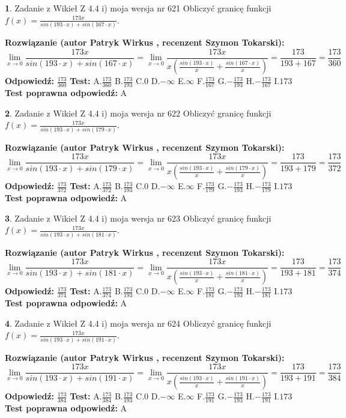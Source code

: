 \documentclass[12pt, a4paper]{article}
\theoremstyle{definition} %
\newtheorem{zad}{}
\newcommand{\zadStart}[1]{\begin{zad}#1\newline}
\newcommand{\zadStop}{\end{zad}}
\newcommand{\rozwStart}[2]{\noindent \textbf{Rozwiązanie (autor #1 , recenzent #2): }\newline}
\newcommand{\rozwStop}{\newline}
\newcommand{\odpStart}{\noindent \textbf{Odpowiedź:}\newline}
\newcommand{\odpStop}{\newline}
\newcommand{\testStart}{\noindent \textbf{Test:}\newline}
\newcommand{\testStop}{\newline}
\newcommand{\kluczStart}{\noindent \textbf{Test poprawna odpowiedź:}\newline}
\newcommand{\kluczStop}{\newline}
\begin{document}
\zadStart{Zadanie z Wikieł Z 4.4 i) moja wersja nr 621}
Obliczyć granicę funkcji $f(x)=\frac{173x}{sin(193\cdot x) +sin(167\cdot x)}$.
\zadStop
\rozwStart{Patryk Wirkus}{Szymon Tokarski}
$$\lim\limits_{x\to 0}\frac{173x}{sin(193\cdot x) +sin(167\cdot x)}=\lim\limits_{x\to 0}\frac{173x}{x(\frac{sin(193\cdot x)}{x}+\frac{sin(167\cdot x)}{x})}=\frac{173}{193+167} = \frac{173}{360}$$
\rozwStop
\odpStart
$\frac{173}{360}$
\odpStop
\testStart
A.$\frac{173}{360}$
B.$\frac{173}{193}$
C.$0$
D.$-\infty$
E.$\infty$
F.$\frac{173}{167}$
G.$-\frac{173}{193}$
H.$-\frac{173}{167}$
I.$173$
\testStop
\kluczStart
A
\kluczStop



\zadStart{Zadanie z Wikieł Z 4.4 i) moja wersja nr 622}
Obliczyć granicę funkcji $f(x)=\frac{173x}{sin(193\cdot x) +sin(179\cdot x)}$.
\zadStop
\rozwStart{Patryk Wirkus}{Szymon Tokarski}
$$\lim\limits_{x\to 0}\frac{173x}{sin(193\cdot x) +sin(179\cdot x)}=\lim\limits_{x\to 0}\frac{173x}{x(\frac{sin(193\cdot x)}{x}+\frac{sin(179\cdot x)}{x})}=\frac{173}{193+179} = \frac{173}{372}$$
\rozwStop
\odpStart
$\frac{173}{372}$
\odpStop
\testStart
A.$\frac{173}{372}$
B.$\frac{173}{193}$
C.$0$
D.$-\infty$
E.$\infty$
F.$\frac{173}{179}$
G.$-\frac{173}{193}$
H.$-\frac{173}{179}$
I.$173$
\testStop
\kluczStart
A
\kluczStop



\zadStart{Zadanie z Wikieł Z 4.4 i) moja wersja nr 623}
Obliczyć granicę funkcji $f(x)=\frac{173x}{sin(193\cdot x) +sin(181\cdot x)}$.
\zadStop
\rozwStart{Patryk Wirkus}{Szymon Tokarski}
$$\lim\limits_{x\to 0}\frac{173x}{sin(193\cdot x) +sin(181\cdot x)}=\lim\limits_{x\to 0}\frac{173x}{x(\frac{sin(193\cdot x)}{x}+\frac{sin(181\cdot x)}{x})}=\frac{173}{193+181} = \frac{173}{374}$$
\rozwStop
\odpStart
$\frac{173}{374}$
\odpStop
\testStart
A.$\frac{173}{374}$
B.$\frac{173}{193}$
C.$0$
D.$-\infty$
E.$\infty$
F.$\frac{173}{181}$
G.$-\frac{173}{193}$
H.$-\frac{173}{181}$
I.$173$
\testStop
\kluczStart
A
\kluczStop



\zadStart{Zadanie z Wikieł Z 4.4 i) moja wersja nr 624}
Obliczyć granicę funkcji $f(x)=\frac{173x}{sin(193\cdot x) +sin(191\cdot x)}$.
\zadStop
\rozwStart{Patryk Wirkus}{Szymon Tokarski}
$$\lim\limits_{x\to 0}\frac{173x}{sin(193\cdot x) +sin(191\cdot x)}=\lim\limits_{x\to 0}\frac{173x}{x(\frac{sin(193\cdot x)}{x}+\frac{sin(191\cdot x)}{x})}=\frac{173}{193+191} = \frac{173}{384}$$
\rozwStop
\odpStart
$\frac{173}{384}$
\odpStop
\testStart
A.$\frac{173}{384}$
B.$\frac{173}{193}$
C.$0$
D.$-\infty$
E.$\infty$
F.$\frac{173}{191}$
G.$-\frac{173}{193}$
H.$-\frac{173}{191}$
I.$173$
\testStop
\kluczStart
A
\kluczStop
\end{document}
